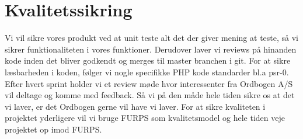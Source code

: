 \section*{Kvalitetssikring}
Vi vil sikre vores produkt ved at unit teste alt det der giver mening at teste,
så vi sikrer funktionaliteten i vores funktioner. Derudover laver vi reviews på hinanden kode inden
det bliver godkendt og merges til master branchen i git.
For at sikre læsbarheden i koden, følger vi nogle specifikke PHP kode standarder bl.a psr-0.
Efter hvert sprint holder vi et review møde hvor interessenter fra Ordbogen A/S vil deltage og komme med feedback.
Så vi på den måde hele tiden sikre os at det vi laver, er det Ordbogen gerne vil have vi laver.
For at sikre kvaliteten i projektet yderligere vil vi bruge FURPS som kvalitetsmodel og hele tiden
veje projektet op imod FURPS.
